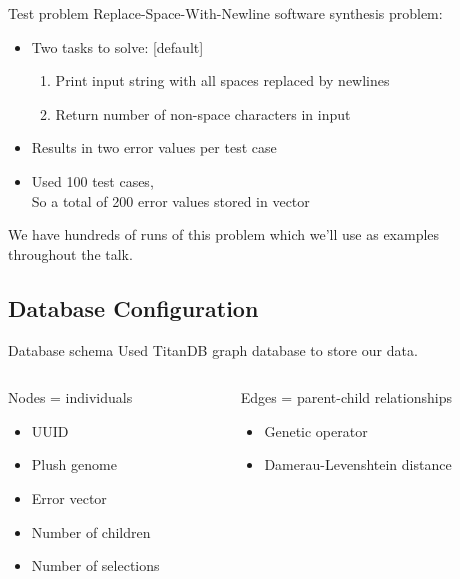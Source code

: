 \documentclass{beamer}
\begin{document}
\begin{frame}{Test problem}
Replace-Space-With-Newline software synthesis problem:
\vspace{.5em}
\begin{itemize}
    \setlength\itemsep{.5em}
	\item Two tasks to solve:
    [default]
    \begin{enumerate}
    	\item Print input string with all spaces replaced by newlines
        \item Return number of non-space characters in input
    \end{enumerate}
	\item Results in two error values per test case
	\item Used 100 test cases, \\ \hspace{.25cm} So a total of 200 error values stored in vector
\end{itemize}
\vspace{1em}
We have hundreds of runs of this problem which we'll use as examples throughout the talk.
\end{frame}

\subsection{Database Configuration}
\begin{frame}{Database schema}
Used TitanDB graph database to store our data.
\vspace{.5cm}
\begin{columns}[t]
\begin{column}{0.45\textwidth}
Nodes = individuals
	\begin{itemize}
    	\setlength\itemsep{.5em}
		\item UUID
		\item Plush genome
		\item Error vector
		\item Number of children
		\item Number of selections
	\end{itemize}
\end{column}
\begin{column}{0.5\textwidth}
Edges = parent-child relationships
	\begin{itemize}
    	\setlength\itemsep{.5em}
		\item Genetic operator
		\item Damerau-Levenshtein distance
	\end{itemize}
\end{column}
\end{columns}
\end{frame}
\end{document}
